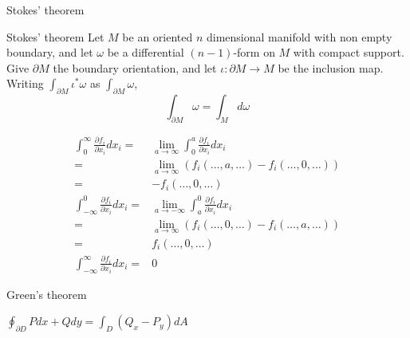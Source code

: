 \documentclass[9pt]{beamer}
\begin{document}
\begin{frame}{Stokes' theorem}
    \begin{block}{Stokes' theorem}
    Let $M$ be an oriented $n$ dimensional manifold with non empty boundary, and let $\omega$ be a differential $(n-1)$-form on $M$ with compact support. Give $\partial M$ the boundary orientation, and let $\iota:\partial M \rightarrow M$ be the inclusion map. Writing $\int_{\partial M}\iota^*\omega$ as $\int_{\partial M}\omega$, \[\int_{\partial M}\omega = \int_Md\omega\]
    \end{block}
\end{frame}

\begin{frame}
    \begin{align*}
        \int_0^\infty \frac{\partial f_i}{\partial x_i}dx_i=&\lim_{a \rightarrow \infty}\int_0^a \frac{\partial f_i}{\partial x_i} dx_i\\
        =&\lim_{a \rightarrow \infty}(f_i(\dots,a,\dots)-f_i(\dots,0,\dots))\\
        =&-f_i(\dots,0,\dots)\\
        \int_{-\infty}^0 \frac{\partial f_i}{\partial x_i}dx_i=&\lim_{a \rightarrow -\infty}\int_a^0 \frac{\partial f_i}{\partial x_i} dx_i\\
        =&\lim_{a \rightarrow \infty}(f_i(\dots,0,\dots)-f_i(\dots,a,\dots))\\
        =&f_i(\dots,0,\dots)\\
        \int_{-\infty}^\infty\frac{\partial f_i}{\partial x_i}dx_i=&0
    \end{align*}
\end{frame}

\begin{frame}{Green's theorem}
    \begin{center}
        $\oint_{\partial D}Pdx+Qdy=\int_D(Q_x-P_y)dA$
    \end{center}
\end{frame}
\end{document}
